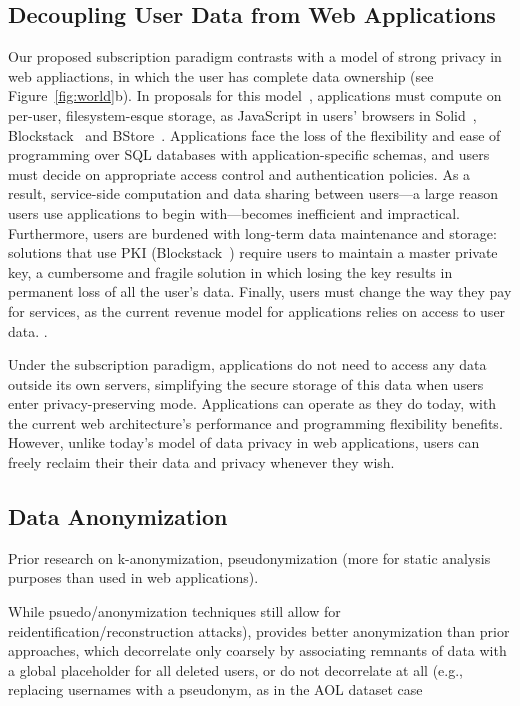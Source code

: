 \subsection{Decoupling User Data from Web Applications}
Our proposed subscription paradigm contrasts with a model of strong privacy in web appliactions, in
which the user has complete data ownership (see Figure~\ref{fig:world}b). In proposals for this
model~\cite{solid, amber, w5, blockstack, bstore}, applications must compute on per-user, filesystem-esque
storage, \eg as JavaScript in users' browsers in Solid~\cite{solid}, Blockstack~\cite{blockstack} and
BStore~\cite{bstore}. Applications face the loss of the flexibility and ease of programming over SQL
databases with application-specific schemas, and users must decide on appropriate access control and
authentication policies. As a result, service-side computation and data sharing between users---a
large reason users use applications to begin with---becomes inefficient and impractical. 
%
Furthermore, users are burdened with long-term data maintenance and storage: solutions that use PKI
(\eg Blockstack~\cite{blockstack}) require users to maintain a
master private key, a cumbersome and fragile solution in which losing the key results in permanent
loss of all the user's data.
%
Finally, users must change the way they pay for services, as the current revenue model for
applications relies on access to user data. 
.

Under the subscription paradigm, applications do not need to access any data outside its own
servers, simplifying the secure storage of this data when users enter privacy-preserving mode.
Applications can operate as they do today, with the current web architecture's performance and
programming flexibility benefits. However, unlike today's model of data privacy in web applications,
users can freely reclaim their their data and privacy whenever they wish.

\subsection{Data Anonymization}

Prior research on k-anonymization, pseudonymization (more for static analysis purposes than used in
web applications).

While psuedo/anonymization
techniques still allow for reidentification/reconstruction attacks), \name provides better
anonymization than prior approaches, which decorrelate only coarsely by associating remnants of data
with a global placeholder for all deleted users, or do not decorrelate at all (e.g., replacing
usernames with a pseudonym, as in the AOL dataset case~%

